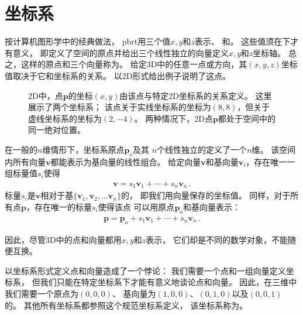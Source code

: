 \section{坐标系}\label{sec:坐标系}

按计算机图形学中的经典做法，
pbrt用三个值$x,y$和$z$表示、
和。
这些值须在下才有意义，
即定义了空间的原点并给出三个线性独立的向量定义$x,y$和$z$坐标轴。
总之，这样的原点和三个向量称为。
给定3D中的任意一点或方向，其$(x,y,z)$坐标值取决于它和坐标系的关系。
以2D形式给出例子说明了这点。
\begin{figure}[htbp]
    \centering
    \caption{2D中，点$\bm p$的坐标$(x,y)$由该点与特定2D坐标系的关系定义。
        这里展示了两个坐标系；
        该点关于实线坐标系的坐标为$(8,8)$，但关于虚线坐标系的坐标为$(2,-4)$。
        两种情况下，2D点$\bm p$都处于空间中的同一绝对位置。}
    \label{fig:2.1}
\end{figure}

在一般的$n$维情形下，坐标系原点$\bm p_\mathrm{o}$及其
$n$个线性独立的定义了一个$n$维。
该空间内所有向量$\bm v$都能表示为基向量的线性组合。
给定向量$\bm v$和基向量$\bm v_i$，存在唯一一组标量值$s_i$使得
\begin{align*}
    \bm v=s_1\bm v_1+\cdots+s_n\bm v_n\, .
\end{align*}
标量$s_i$是$\bm v$相对于基$\{\bm v_1,\bm v_2,\ldots \bm v_n\}$的，
即我们用向量保存的坐标值。
同样，对于所有点$\bm p$，存在唯一的标量$s_i$使得该点
可以用原点$\bm p_\mathrm{o}$和基向量表示：
\begin{align*}
    \bm p=\bm p_\mathrm{o}+s_1\bm v_1+\cdots+s_n\bm v_n\, .
\end{align*}

因此，尽管3D中的点和向量都用$x,y$和$z$表示，
它们却是不同的数学对象，不能随便互换。

以坐标系形式定义点和向量造成了一个悖论：
我们需要一个点和一组向量定义坐标系，
但我们只能在特定坐标系下才能有意义地谈论点和向量。
因此，在三维中我们需要一个原点为$(0,0,0)$、
基向量为$(1,0,0)$、$(0,1,0)$以及$(0,0,1)$
的。
其他所有坐标系都参照这个规范坐标系定义，
该坐标系称为。

